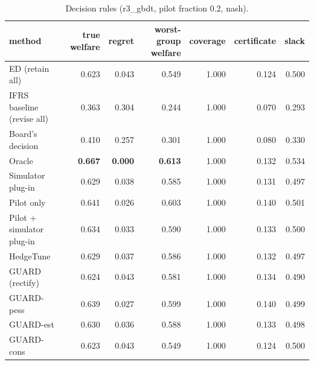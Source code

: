 \begin{table}[t]
\centering
\small
\begin{tabular}{lrrrrrr}
\toprule
method & true welfare & regret & worst-group welfare & coverage & certificate & slack \\
\midrule
ED (retain all) & 0.623 & 0.043 & 0.549 & 1.000 & 0.124 & 0.500 \\
IFRS baseline (revise all) & 0.363 & 0.304 & 0.244 & 1.000 & 0.070 & 0.293 \\
Board's decision & 0.410 & 0.257 & 0.301 & 1.000 & 0.080 & 0.330 \\
Oracle & \textbf{0.667} & \textbf{0.000} & \textbf{0.613} & 1.000 & 0.132 & 0.534 \\
Simulator plug-in & 0.629 & 0.038 & 0.585 & 1.000 & 0.131 & 0.497 \\
Pilot only & 0.641 & 0.026 & 0.603 & 1.000 & 0.140 & 0.501 \\
Pilot + simulator plug-in & 0.634 & 0.033 & 0.590 & 1.000 & 0.133 & 0.500 \\
HedgeTune & 0.629 & 0.037 & 0.586 & 1.000 & 0.132 & 0.497 \\
GUARD (rectify) & 0.624 & 0.043 & 0.581 & 1.000 & 0.134 & 0.490 \\
GUARD-pess & 0.639 & 0.027 & 0.599 & 1.000 & 0.140 & 0.499 \\
GUARD-est & 0.630 & 0.036 & 0.588 & 1.000 & 0.133 & 0.498 \\
GUARD-cons & 0.623 & 0.043 & 0.549 & 1.000 & 0.124 & 0.500 \\
\bottomrule
\end{tabular}
\caption{Decision rules (r3\_gbdt, pilot fraction 0.2, nash).}
\label{tab:methods-nash}
\end{table}
